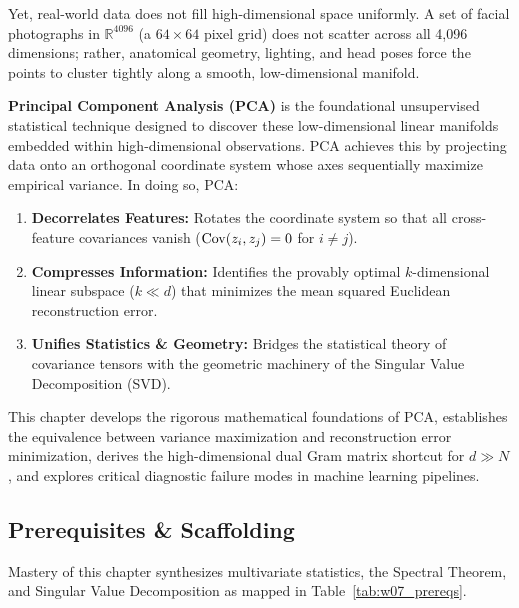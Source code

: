 Yet, real-world data does not fill high-dimensional space uniformly. A set of facial photographs in $\mathbb{R}^{4096}$ (a $64 \times 64$ pixel grid) does not scatter across all 4,096 dimensions; rather, anatomical geometry, lighting, and head poses force the points to cluster tightly along a smooth, low-dimensional manifold.

\textbf{Principal Component Analysis (PCA)} is the foundational unsupervised statistical technique designed to discover these low-dimensional linear manifolds embedded within high-dimensional observations. PCA achieves this by projecting data onto an orthogonal coordinate system whose axes sequentially maximize empirical variance. In doing so, PCA:
\begin{enumerate}
    \item \textbf{Decorrelates Features:} Rotates the coordinate system so that all cross-feature covariances vanish ($\operatorname{Cov}(z_i, z_j) = 0$ for $i \ne j$).
    \item \textbf{Compresses Information:} Identifies the provably optimal $k$-dimensional linear subspace ($k \ll d$) that minimizes the mean squared Euclidean reconstruction error.
    \item \textbf{Unifies Statistics \& Geometry:} Bridges the statistical theory of covariance tensors with the geometric machinery of the Singular Value Decomposition (SVD).
\end{enumerate}

This chapter develops the rigorous mathematical foundations of PCA, establishes the equivalence between variance maximization and reconstruction error minimization, derives the high-dimensional dual Gram matrix shortcut for $d \gg N$, and explores critical diagnostic failure modes in machine learning pipelines.

\subsection{Prerequisites \& Scaffolding}
Mastery of this chapter synthesizes multivariate statistics, the Spectral Theorem, and Singular Value Decomposition as mapped in Table~\ref{tab:w07_prereqs}.

